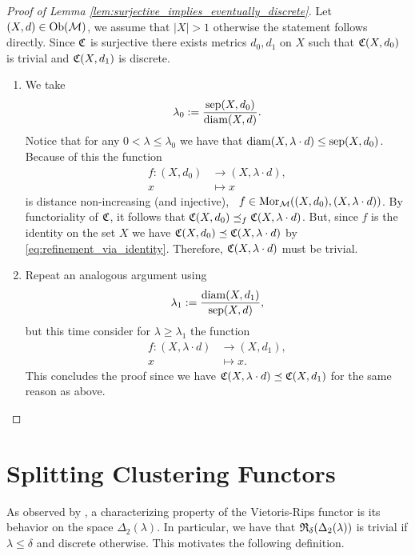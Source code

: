 \begin{proof}[Proof of Lemma \ref{lem:surjective_implies_eventually_discrete}]
    Let $(X,d) \in \mathrm {Ob}(\mathcal{M})$, we assume that $|X| > 1$ otherwise the statement follows directly. Since $\mathfrak{C}$ is surjective there exists metrics $d_0, d_1$ on $X$ such that $\mathfrak{C}(X,d_0)$ is trivial and $\mathfrak{C}(X,d_1)$ is discrete.
    \begin{enumerate}
        \item We take
        $$
        \lambda_0 := \frac{\mathrm{sep}(X,d_0)}{\mathrm{diam}(X,d)}.
        $$ 
        Notice that for any $0 < \lambda \le \lambda_0$ we have that $\mathrm{diam}(X,\lambda \cdot d) \le \mathrm{sep}(X,d_0)$. Because of this the function
        \begin{align*}
            f: (X, d_0) &\longrightarrow (X, \lambda \cdot d),\\
            x &\longmapsto x
        \end{align*}
        is distance non-increasing (and injective), \ie\ $f \in \mathrm {Mor}_{\mathcal{M}}((X,d_0), (X,\lambda \cdot d))$.
        By functoriality of $\mathfrak{C}$, it follows that $\mathfrak{C}(X,d_0) \preceq_f \mathfrak{C}(X,\lambda \cdot d)$. But, since $f$ is the identity on the set $X$ we have $\mathfrak{C}(X,d_0) \preceq \mathfrak{C}(X,\lambda \cdot d)$ by \eqref{eq:refinement_via_identity}. Therefore, $\mathfrak{C}(X,\lambda \cdot d)$ must be trivial.

        \item Repeat an analogous argument using
        $$
        \lambda_1 := \frac{\mathrm{diam}(X,d_1)}{\mathrm{sep}(X,d)},
        $$
        but this time consider for $\lambda \ge \lambda_1$ the function
        \begin{align*}
            f: (X, \lambda \cdot d) &\longrightarrow (X, d_1),\\
            x &\longmapsto x.
        \end{align*}
        This concludes the proof since we have $\mathfrak{C}(X,\lambda \cdot d) \preceq \mathfrak{C}(X,d_1)$ for the same reason as above.
    \end{enumerate}
\end{proof}

\section{Splitting Clustering Functors}

As observed by \cite[Thm.~6.4]{Carlsson2010}, a characterizing property of the Vietoris-Rips functor is its behavior on the space $\Delta_2(\lambda)$. In particular, we have that $\mathfrak{R}_\delta(\Delta_2(\lambda))$ is trivial if $\lambda \le \delta$ and discrete otherwise.
This motivates the following definition.

